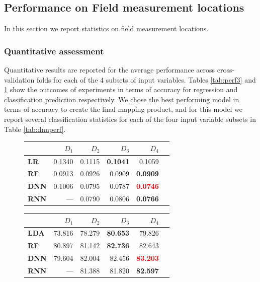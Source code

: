 \def\year{2017}\relax \documentclass[letterpaper]{article}
\begin{document}
\subsection{Performance on Field measurement locations}
In this section we report statistics on field measurement locations.
\subsubsection{Quantitative assessment} \label{sec:res1}
Quantitative results are reported for the average performance across cross-validation folds for each of the 4 subsets of input variables. Tables \ref{tab:perf3} and \ref{tab:perf2} show the outcomes of experiments in terms of accuracy for regression and classification prediction respectively. We chose the best performing model in terms of accuracy to create the final mapping product, and for this model we report several classification statistics for each of the four input variable subsets in Table \ref{tab:dnnperf}.
  \begin{figure}
  \begin{minipage}[b]{0.49\textwidth}
    \centering
\begin{tabularx}{\linewidth}{l r r r r r}
		\toprule[.2em]
		 &$D_1$ &$D_2$&$D_3$&$D_4$\\
		\midrule
		{\bf LR}&0.1340  & 0.1115&{\bf 0.1041} &0.1059\\
		{\bf RF}& 0.0913  &0.0926&0.0909 &{\bf 0.0909}\\
		{\bf DNN}&0.1006  &0.0795&0.0787 &\textcolor{red}{\bf 0.0746}\\
		{\bf RNN}&---  & 0.0790&0.0806 &{\bf 0.0766}\\
		\bottomrule[.2em]
	\end{tabularx}
	 \label{tab:perf3}
  \end{minipage}
  \hfill
  \begin{minipage}[b]{0.49\textwidth}
    \centering
 \begin{tabularx}{\linewidth}{l r r r r r}
		\toprule[.2em]
		 &$D_1$& $D_2$&$D_3$&$D_4$\\
		\midrule
		{\bf LDA}&73.816 & 78.279&{\bf 80.653} &79.826\\
		{\bf RF}&80.897 &81.142&{\bf 82.736} &82.643\\
		{\bf DNN}&79.604& 82.004&82.456 &\textcolor{red}{\bf 83.203}\\
		{\bf RNN}&--- & 81.388&81.820 &{\bf 82.597}\\
		\bottomrule[.2em]
	\end{tabularx}
	 \label{tab:perf2}
    \end{minipage}
  \end{figure}
\end{document}
